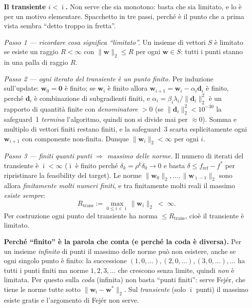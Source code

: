 \documentclass[11pt,a4paper]{article}
\theoremstyle{definition}
\newcommand{\w}{\bm{w}}
\newcommand{\dvec}{\bm{d}}
\newcommand{\wstar}{\w^{*}}
\newcommand{\fstar}{f^{*}}
\newcommand{\fref}{f_{\mathrm{ref}}}
\newcommand{\norm}[1]{\lVert #1\rVert}
\begin{document}
\textbf{Il transiente $i<\bar\imath$.} Non serve che sia monotono: basta che sia limitato, e lo
è per un motivo elementare. Spacchetto in tre passi, perché è il punto che a prima vista sembra
``detto troppo in fretta''.

\emph{Passo 1 --- ricordare cosa significa ``limitato''.} Un insieme di vettori $S$ è limitato
se esiste un raggio $R<\infty$ con $\norm{\w}_2\le R$ per ogni $\w\in S$: tutti i punti stanno
in una palla di raggio $R$.

\emph{Passo 2 --- ogni iterato del transiente è un punto finito.} Per induzione sull'update:
$\w_0=\bm0$ è finito; se $\w_i$ è finito allora $\w_{i+1}=\w_i-\alpha_i\dvec_i$ è finito, perché
$\dvec_i$ è combinazione di subgradienti finiti, e
$\alpha_i=\beta_i\lambda_i/\norm{\dvec_i}_2^2$ è un rapporto di quantità finite con
\emph{denominatore $>0$} (se $\norm{\dvec_i}_2^2<10^{-30}$ la safeguard~1 \emph{termina}
l'algoritmo, quindi non si divide mai per $\approx0$). Somma e multiplo di vettori finiti
restano finiti, e la safeguard~3 scarta esplicitamente ogni $\w_{i+1}$ con componente
non-finita. Dunque $\norm{\w_i}_2<\infty$ per ogni $i$.

\emph{Passo 3 --- finiti \emph{quanti} punti $\Rightarrow$ massimo delle norme.} Il numero di
iterati del transiente è $\bar\imath<\infty$ ($\bar\imath$ è finito perché
$\delta_k=\rho^k\delta_0\to0$ e basta $\delta\le\fref-\fstar$ per ripristinare la feasibility
del target). Le norme $\norm{\w_0}_2,\dots,\norm{\w_{\bar\imath-1}}_2$ sono allora
\emph{finitamente molti numeri finiti}, e tra finitamente molti reali il massimo \emph{esiste
sempre}:
\[
R_{\mathrm{trans}}:=\max_{0\le i<\bar\imath}\norm{\w_i}_2 \;<\;\infty .
\]
Per costruzione ogni punto del transiente ha norma $\le R_{\mathrm{trans}}$, cioè il transiente
è limitato.

\begin{keybox}
\textbf{Perché ``finito'' è la parola che conta (e perché la coda è diversa).} Per un insieme
\emph{infinito} di punti il massimo delle norme può non esistere, anche se ogni singolo punto è
finito: la successione $(1,0,\dots),(2,0,\dots),(3,0,\dots),\dots$ ha tutti i punti finiti ma
norme $1,2,3,\dots$ che crescono senza limite, quindi \emph{non} è limitata. Per questo sulla
\emph{coda} (infinita) non basta ``punti finiti'': serve Fej\'er, che tiene le norme tutte sotto
$\norm{\w_{\bar\imath}-\wstar}_2$. Sul \emph{transiente} (solo $\bar\imath$ punti) il massimo
esiste gratis e l'argomento di Fej\'er non serve.
\end{keybox}
\end{document}
